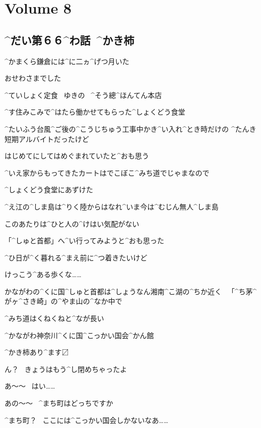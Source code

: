 \section{Volume 8}

\subsection{^{だい}{第}６６^{わ}{話}\ ^{かき}{柿}}

\page[4]
\Alpha ^{かまくら}{鎌倉}には^{に}{二}ヵ^{げつ}{月}いた

\Alpha おせわさまでした

\page[5]
\Sign ^{ていしょく}{定食}
\ ゆきの
\ ^{そう}{總}^{ほんてん}{本店}

\Alpha ^{す}{住}みこみで^{はたら}{働}かせてもらった^{しょくどう}{食堂}

\Alpha ^{たいふう}{台風}^{ご}{後}の^{こうじちゅう}{工事中}かき^{い}{入}れ^{とき}{時}だけの
^{たんき}{短期}アルバイトだったけど

\Alpha はじめてにしてはめぐまれていたと^{おも}{思}う

\page[7]
\Alpha ^{いえ}{家}からもってきたカートはでこぼこ^{みち}{道}でじゃまなので

\Alpha ^{しょくどう}{食堂}にあずけた

\page[8]
\Alpha ^{え}{江}の^{しま}{島}は^{りく}{陸}からはなれ^{いま}{今}は^{むじん}{無人}^{しま}{島}

\Alpha このあたりは^{ひと}{人}の^{けはい}{気配}がない

\page[9]
\Alpha 「^{しゅと}{首都}」へ^{い}{行}ってみようと^{おも}{思}った

\Alpha ^{ひ}{日}が^{く}{暮}れる^{まえ}{前}に^{つ}{着}きたいけど

\Alpha けっこう^{ある}{歩}くな……

\Alpha かながわの^{くに}{国}^{しゅと}{首都}は^{しょうなん}{湘南}^{こ}{湖}の^{ちか}{近}く
\ 「^{ち}{茅}^{が}{ヶ}^{さき}{崎}」の^{やま}{山}の^{なか}{中}で

\Alpha ^{みち}{道}はくねくねと^{なが}{長}い

\page[10]
\Sign ^{かながわ}{神奈川}^{くに}{国}^{こっかい}{国会}^{かん}{館}

\Sign ^{かき}{柿}あり^{ます}{〼}

\page[11]
\Person ん？
\ きょうはもう^{し}{閉}めちゃったよ

\Alpha あ〜〜
\ はい……

\Alpha あの〜〜
\ ^{まち}{町}はどっちですか

\Person ^{まち}{町}？
\ ここには^{こっかい}{国会}しかないなあ……

